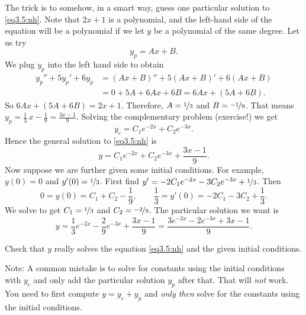 The trick is to somehow, in a smart way, guess one particular solution to
\eqref{eq3.5:nh}.  Note that $2x+1$ is a polynomial, and the left-hand 
side of the equation will be a polynomial if we let $y$ be a polynomial of
the same degree.  Let us try
\begin{equation*}
y_p = Ax + B .
\end{equation*}
We plug $y_p$ into the left hand side to obtain
\begin{equation*}
\begin{split}
y_p'' + 5y_p'+ 6y_p & =
(Ax+B)'' + 5(Ax+B)' + 6(Ax+B)
\\
& = 
0 + 5A + 6Ax + 6B = 6Ax+ (5A+6B) .
\end{split}
\end{equation*}
So $6Ax+(5A+6B) = 2x+1$.  Therefore, $A = \nicefrac{1}{3}$ and $B = \nicefrac{-1}{9}$.
That means
$y_p = \frac{1}{3}\, x - \frac{1}{9} = \frac{3x-1}{9}$.
Solving the complementary
problem (exercise!) we get
\begin{equation*}
y_c = C_1 e^{-2x} + C_2 e^{-3x}.
\end{equation*}
Hence the general solution to \eqref{eq3.5:nh} is
\begin{equation*}
y = C_1 e^{-2x} + C_2 e^{-3x} + \frac{3x-1}{9} .
\end{equation*}
Now suppose we are further given some initial conditions.  For example, $y(0) = 0$ and
$y'(0) = \nicefrac{1}{3}$.  First find $y' = - 2C_1 e^{-2x} - 3C_2 e^{-3x}
+ \nicefrac{1}{3}$.
Then
\begin{equation*}
0 = y(0) = C_1 + C_2 -\frac{1}{9} , \qquad
\frac{1}{3} = y'(0) = - 2C_1 - 3C_2 + \frac{1}{3} .
\end{equation*}
We solve to get $C_1 = \nicefrac{1}{3}$ and $C_2 = \nicefrac{-2}{9}$.
The particular solution we want is
\begin{equation*}
y = \frac{1}{3} e^{-2x} - \frac{2}{9} e^{-3x} + \frac{3x-1}{9} =
\frac{3 e^{-2x} - 2 e^{-3x} + 3x-1}{9} .
\end{equation*}

\begin{exercise}
Check that $y$ really solves the equation \eqref{eq3.5:nh}
and the given initial conditions.
\end{exercise}

Note: A common mistake is to solve for constants using the initial
conditions with $y_c$ and only add the particular solution $y_p$ after that.
That will \emph{not} work.  You need to first compute $y = y_c + y_p$ and
\emph{only then} solve for the constants using the initial conditions.

